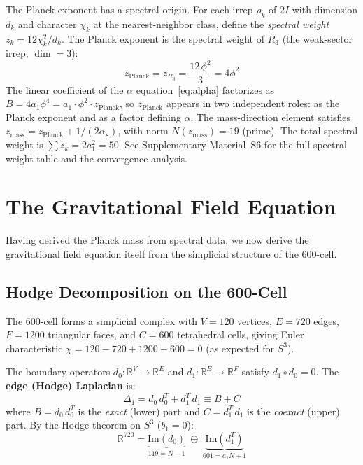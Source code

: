 \documentclass[12pt,a4paper]{article}
\theoremstyle{definition}
\begin{document}
The Planck exponent has a spectral origin.  For each irrep $\rho_k$ of $2I$ with dimension $d_k$ and character $\chi_k$ at the nearest-neighbor class, define the \emph{spectral weight} $z_k = 12\chi_k^2/d_k$.  The Planck exponent is the spectral weight of $R_3$ (the weak-sector irrep, $\dim = 3$):
\begin{equation}
\boxed{z_{\text{Planck}} = z_{R_3} = \frac{12\,\phi^2}{3} = 4\phi^2}
\label{eq:zP_spectral}
\end{equation}
The linear coefficient of the $\alpha$ equation~\eqref{eq:alpha} factorizes as $B = 4a_1\phi^4 = a_1 \cdot \phi^2 \cdot z_{\text{Planck}}$, so $z_{\text{Planck}}$ appears in two independent roles: as the Planck exponent and as a factor defining $\alpha$.  The mass-direction element satisfies $z_{\text{mass}} = z_{\text{Planck}} + 1/(2\alpha_s)$, with norm $N(z_{\text{mass}}) = 19$ (prime).  The total spectral weight is $\sum z_k = 2a_1^2 = 50$.  See Supplementary Material~S6 for the full spectral weight table and the convergence analysis.


\section{The Gravitational Field Equation}
\label{sec:gravity}

Having derived the Planck mass from spectral data, we now derive the gravitational field equation itself from the simplicial structure of the 600-cell.

\subsection{Hodge Decomposition on the 600-Cell}

The 600-cell forms a simplicial complex with $V = 120$ vertices, $E = 720$ edges, $F = 1200$ triangular faces, and $C = 600$ tetrahedral cells, giving Euler characteristic $\chi = 120 - 720 + 1200 - 600 = 0$ (as expected for $S^3$).

The boundary operators $d_0: \mathbb{R}^V \to \mathbb{R}^E$ and $d_1: \mathbb{R}^E \to \mathbb{R}^F$ satisfy $d_1 \circ d_0 = 0$. The \textbf{edge (Hodge) Laplacian} is:
\begin{equation}
\Delta_1 = d_0\,d_0^T + d_1^T\,d_1 \equiv B + C
\end{equation}
where $B = d_0\,d_0^T$ is the \emph{exact} (lower) part and $C = d_1^T\,d_1$ is the \emph{coexact} (upper) part. By the Hodge theorem on $S^3$ ($b_1 = 0$):
\begin{equation}
\mathbb{R}^{720} = \underbrace{\mathrm{Im}(d_0)}_{119 = N-1} \;\oplus\; \underbrace{\mathrm{Im}(d_1^T)}_{601 = a_1 N + 1}
\end{equation}
\end{document}
